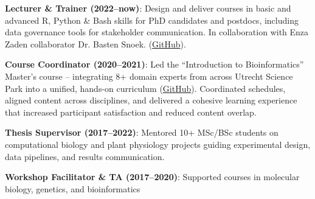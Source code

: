 \documentclass[a4paper,10pt]{article}
\begin{document}
\begin{description}
  \raggedright
  \item \textbf{Lecturer \& Trainer (2022–now)}: Design and deliver courses in 
    basic and advanced R, Python \& Bash skills for PhD candidates and postdocs, 
    including data governance tools for stakeholder communication.
    In collaboration with Enza Zaden collaborator Dr. Basten Snoek.
    (\href{https://github.com/lauralwd/professional_education}{GitHub}).
  \item \textbf{Course Coordinator (2020–2021)}: Led the “Introduction to Bioinformatics” Master’s course 
    -- integrating 8+ domain experts from across Utrecht Science Park into a unified, hands-on curriculum 
    (\href{https://lauralwd.github.io/metagenomicspractical/}{GitHub}). 
    Coordinated schedules, aligned content across disciplines, 
    and delivered a cohesive learning experience that increased participant satisfaction and reduced content overlap.
  \item \textbf{Thesis Supervisor (2017–2022)}: Mentored 10+ MSc/BSc students on computational biology and 
    plant physiology projects guiding experimental design, data pipelines, and results communication.
  \item \textbf{Workshop Facilitator \& TA (2017–2020)}: Supported courses in molecular biology, genetics, and bioinformatics
\end{description}

\vfill


\end{document}

